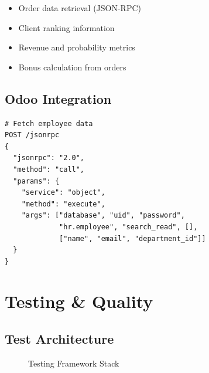 \documentclass[11pt,a4paper,oneside,openany]{book}
\begin{document}
\begin{itemize}
    \item Order data retrieval (JSON-RPC)
    \item Client ranking information
    \item Revenue and probability metrics
    \item Bonus calculation from orders
\end{itemize}

\section{Odoo Integration}

\noindent\begin{minipage}{\linewidth}
\begin{lstlisting}[caption=Odoo JSON-RPC Integration]
# Fetch employee data
POST /jsonrpc
{
  "jsonrpc": "2.0",
  "method": "call",
  "params": {
    "service": "object",
    "method": "execute",
    "args": ["database", "uid", "password", 
             "hr.employee", "search_read", [], 
             ["name", "email", "department_id"]]
  }
}
\end{lstlisting}
\end{minipage}

\chapter{Testing \& Quality}

\section{Test Architecture}

\begin{figure}[H]
\centering
{}
\caption{Testing Framework Stack}
\end{figure}
\end{document}
